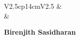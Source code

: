 \noindent
\begin{tabular}{V{2.5}cp{14cm}V{2.5}}
 &\\
 & 

\centerline{\large\bf Birenjith Sasidharan }


\end{tabular}
